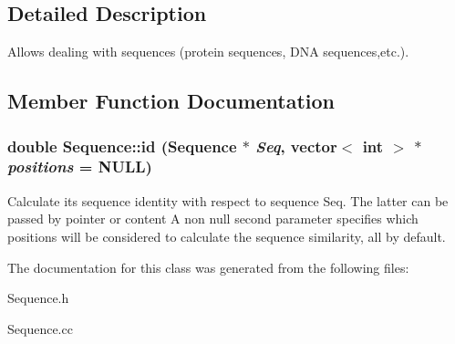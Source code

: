 \subsection{Detailed Description}
Allows dealing with sequences (protein sequences, DNA sequences,etc.). 



\subsection{Member Function Documentation}
\subsubsection{\setlength{\rightskip}{0pt plus 5cm}double Sequence::id ({\bf Sequence} $\ast$ {\em Seq}, vector$<$ int $>$ $\ast$ {\em positions} = NULL)}\label{classSequence_a8}


Calculate its sequence identity with respect to sequence Seq. The latter can be passed by pointer or content A non null second parameter specifies which positions will be considered to calculate the sequence similarity, all by default. 

The documentation for this class was generated from the following files:\begin{CompactItemize}
\item 
Sequence.h\item 
Sequence.cc\end{CompactItemize}
